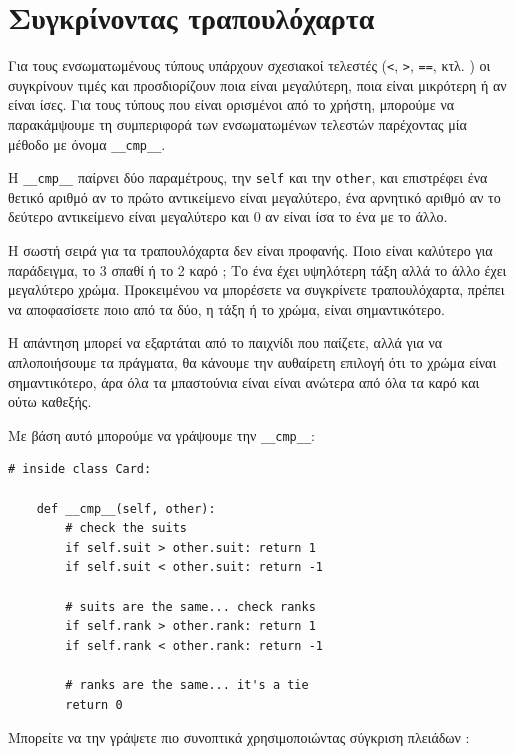 \documentclass[10pt]{book}
\begin{document}
\section{Συγκρίνοντας τραπουλόχαρτα}
\label{comparecard}

Για τους ενσωματωμένους τύπους υπάρχουν σχεσιακοί τελεστές  ({\tt <}, {\tt >}, {\tt ==},   κτλ. )  οι συγκρίνουν τιμές και προσδιορίζουν ποια είναι μεγαλύτερη, ποια είναι μικρότερη ή αν είναι ίσες.  Για τους τύπους που είναι ορισμένοι από το χρήστη, μπορούμε να παρακάμψουμε τη συμπεριφορά των ενσωματωμένων τελεστών παρέχοντας μία μέθοδο 
με όνομα  \verb"__cmp__".

 Η  \verb"__cmp__"  παίρνει δύο παραμέτρους, την  {\tt self}  και την   {\tt other},  και επιστρέφει ένα θετικό αριθμό αν το πρώτο αντικείμενο είναι 
μεγαλύτερο, ένα αρνητικό αριθμό αν το δεύτερο αντικείμενο είναι μεγαλύτερο και 0 αν είναι 
ίσα το ένα με το άλλο.

Η σωστή σειρά για τα τραπουλόχαρτα δεν είναι προφανής.  Ποιο είναι καλύτερο για παράδειγμα, το 3 σπαθί ή το 2 καρό ;   Το ένα έχει υψηλότερη τάξη αλλά το άλλο 
έχει μεγαλύτερο χρώμα.  Προκειμένου να μπορέσετε να συγκρίνετε τραπουλόχαρτα, πρέπει να 
αποφασίσετε ποιο από τα δύο, η τάξη ή το χρώμα, είναι σημαντικότερο.

Η απάντηση μπορεί να εξαρτάται από το παιχνίδι που παίζετε, αλλά για να απλοποιήσουμε  
τα πράγματα, θα κάνουμε την αυθαίρετη επιλογή ότι το χρώμα είναι σημαντικότερο, άρα όλα 
τα μπαστούνια είναι είναι ανώτερα από όλα τα καρό και ούτω καθεξής.

Με βάση αυτό μπορούμε να γράψουμε την  \verb"__cmp__":

\begin{verbatim}
# inside class Card:

    def __cmp__(self, other):
        # check the suits
        if self.suit > other.suit: return 1
        if self.suit < other.suit: return -1

        # suits are the same... check ranks
        if self.rank > other.rank: return 1
        if self.rank < other.rank: return -1

        # ranks are the same... it's a tie
        return 0
\end{verbatim}
%
 Μπορείτε να την γράψετε πιο συνοπτικά χρησιμοποιώντας σύγκριση πλειάδων :
\end{document}
